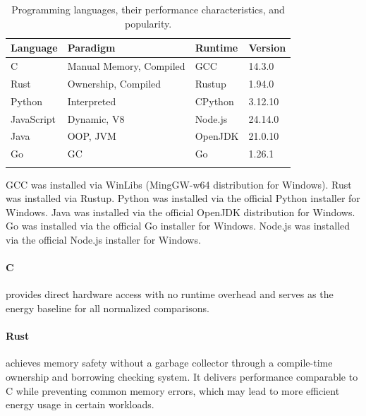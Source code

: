 \begin{table}[h]
    \centering
    \caption{Programming languages, their performance characteristics, and popularity.}\label{tab:programming_languages}
    \small
    \begin{tabular}{llll}
        \hline
        \textbf{Language} & \textbf{Paradigm} & \textbf{Runtime} & \textbf{Version} \\
        \hline
        C                   & Manual Memory, Compiled       & GCC         &  14.3.0             \\
        Rust                & Ownership, Compiled           & Rustup       &  1.94.0                 \\
        Python              & Interpreted                   & CPython     &  3.12.10                 \\
        JavaScript          & Dynamic, V8                   & Node.js     &  24.14.0                 \\
        Java                & OOP, JVM                      &  OpenJDK    &  21.0.10                 \\
        Go                  & GC                            & Go          &  1.26.1             \\
        \hline& 
    \end{tabular}
       
\end{table}

GCC was installed via WinLibs (MingGW-w64 distribution for Windows). Rust was installed via Rustup. Python was installed via the official Python installer for Windows. Java was installed via the official OpenJDK distribution for Windows. Go was installed via the official Go installer for Windows. Node.js was installed via the official Node.js installer for Windows.

\paragraph{C} provides direct hardware access with no runtime overhead and serves as the energy baseline for all normalized comparisons.

\paragraph{Rust} achieves memory safety without a garbage collector through a compile-time ownership and borrowing checking system. It delivers performance comparable to C while preventing common memory errors, which may lead to more efficient energy usage in certain workloads.


